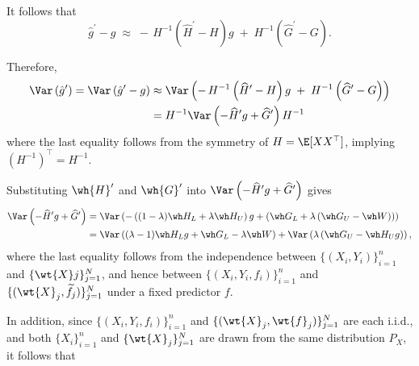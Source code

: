 \noindent
It follows that
\[
\widehat{g}^\prime  - g
\;\approx\;
-\,H^{-1}\left(\widehat{H}^\prime - H\right)g
\;+\;
H^{-1}\left(\widehat{G}^\prime - G\right).
\]

\noindent
Therefore, 
\begin{align*}
\Var\left(\hat g^\prime\right)=\Var\left(\hat g^\prime-g\right)&\approx \Var\left(-\,H^{-1}\left(\widehat{H}^\prime - H\right)g
\;+\;
H^{-1}\left(\widehat{G}^\prime - G\right)\right)\\
&=H^{-1}\Var\left(-\widehat{H}^\prime g+\widehat{G}^\prime\right)H^{-1}
\end{align*}where the last equality follows from the symmetry of $H=\E[XX^\top]$, implying $\left(H^{-1}\right)^\top=H^{-1}$.

\noindent
Substituting $\wh{H}^\prime$ and $\wh{G}^\prime$ into $\Var\left(-\widehat{H}^\prime g+\widehat{G}^\prime\right)$ gives
\begin{align*}
    \Var\left(-\widehat{H}^\prime g+\widehat{G}^\prime\right)&=\Var\left(-\left((1-\lambda)\wh H_L+\lambda \wh H_U\right)g+\left(\wh G_L+\lambda \left(\wh G_U-\wh W\right)\right)\right)\\
    &=\Var\left((\lambda-1)\wh H_Lg +\wh G_L-\lambda\wh W\right)
    +\Var\left(\lambda\left( \wh G_U-\wh H_U g\right)\right),
\end{align*}where the last equality follows from the independence between $\{(X_i, Y_i)\}_{i=1}^n$ and $\{\wt{X}j\}_{j=1}^N$, and hence between $\{(X_i, Y_i, f_i)\}_{i=1}^n$ and $\{(\wt{X}_j, \widetilde{f}_j)\}_{j=1}^N$ under a fixed predictor $f$.

\noindent
In addition, since $\{(X_i, Y_i, f_i)\}_{i=1}^n$ and $\{(\wt{X}_j, \wt{f}_j)\}_{j=1}^N$ are each i.i.d., and both $\{X_i\}_{i=1}^n$ and $\{\wt{X}_j\}_{j=1}^N$ are drawn from the same distribution $P_X$, it follows that 

